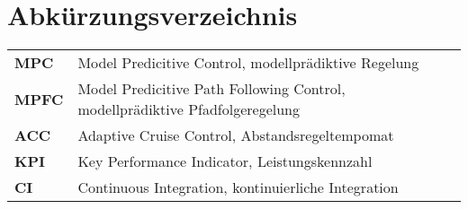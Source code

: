 
\begingroup 
\let\clearpage\relax
\let\cleardoublepage\relax
\let\cleardoublepage\relax

\chapter*{Abkürzungsverzeichnis}
\thispagestyle{empty}
\vspace{-.5em} %
\begin{tabular}{@{} p{\figurelabelwidth} @{} p{\textwidth-\figurelabelwidth}}
\textbf{MPC} & Model Predicitive Control, modellprädiktive Regelung\\
\textbf{MPFC} & Model Predicitive Path Following Control, modellprädiktive Pfadfolgeregelung\\
\textbf{ACC} & Adaptive Cruise Control, Abstandsregeltempomat\\
\textbf{KPI} & Key Performance Indicator, Leistungskennzahl\\
\textbf{CI} & Continuous Integration, kontinuierliche Integration\\
\end{tabular}                
\endgroup
\cleardoublepage